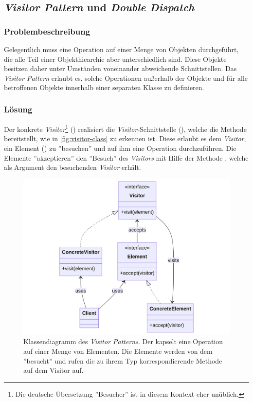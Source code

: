 \subsection{\emph{Visitor Pattern} und \emph{Double Dispatch}}


\subsubsection*{Problembeschreibung}

Gelegentlich muss eine Operation auf einer Menge von Objekten durchgeführt, die alle Teil einer Objekthiearchie aber unterschiedlich sind. Diese Objekte besitzen daher unter Umständen voneinander abweichende Schnittstellen. Das \emph{Visitor Pattern} erlaubt es, solche Operationen außerhalb der Objekte und für alle betroffenen Objekte innerhalb einer separaten Klasse zu definieren. \cite{gamma_design_1995}

\subsubsection*{Lösung}

Der konkrete \emph{Visitor}\footnote{Die deutsche Übersetzung ''Besucher'' ist in diesem Kontext eher unüblich.} () realisiert die \emph{Visitor}-Schnittstelle (), welche die Methode  bereitstellt, wie in \autoref{fig:visitor-class} zu erkennen ist. Diese erlaubt es dem \emph{Visitor}, ein Element () zu ''besuchen'' und auf ihm eine Operation durchzuführen. Die Elemente ''akzeptieren'' den ''Besuch'' des \emph{Visitors} mit Hilfe der Methode , welche als Argument den besuchenden \emph{Visitor} erhält.

\begin{figure}[!ht]
	\centering
	\includegraphics[width=0.75\linewidth]{images/patterns/visitor-class.png}
	\caption{Klassendiagramm des \emph{Visitor Patterns}. Der  kapselt eine Operation auf einer Menge von Elementen. Die Elemente werden von dem  ''besucht'' und rufen die zu ihrem Typ korrespondierende Methode auf dem Visitor auf. \cite{skobeleva_visitor_2023}}
	\label{fig:visitor-class}
\end{figure}

